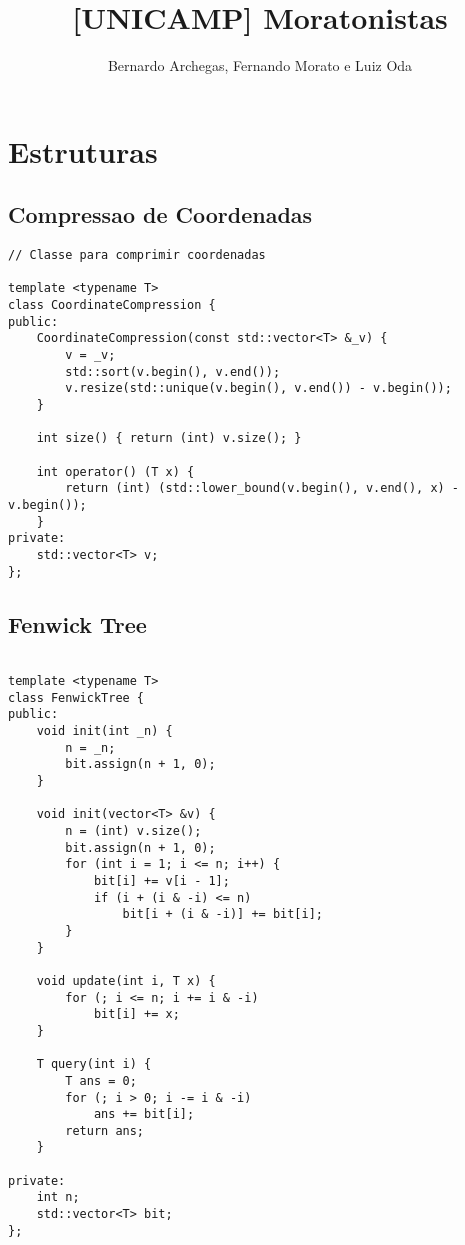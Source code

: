 \documentclass[12pt, a4paper, twoside]{article}
\title{[UNICAMP] Moratonistas}
\author{Bernardo Archegas, Fernando Morato e Luiz Oda}
\begin{document}
\twocolumn
\date{} %
\maketitle


\renewcommand{\contentsname}{Índice} %
\tableofcontents


%
%

\section{Estruturas}

\subsection{Compressao de Coordenadas
}
\begin{lstlisting}
// Classe para comprimir coordenadas

template <typename T>
class CoordinateCompression {
public:
	CoordinateCompression(const std::vector<T> &_v) {
		v = _v;
		std::sort(v.begin(), v.end());
		v.resize(std::unique(v.begin(), v.end()) - v.begin());
	}

	int size() { return (int) v.size(); }

	int operator() (T x) {
		return (int) (std::lower_bound(v.begin(), v.end(), x) - v.begin());
	}
private:
	std::vector<T> v;
};
\end{lstlisting}

\subsection{Fenwick Tree
}
\begin{lstlisting}

template <typename T>
class FenwickTree {
public:
	void init(int _n) {
		n = _n;
		bit.assign(n + 1, 0);
	}

	void init(vector<T> &v) {
		n = (int) v.size();
		bit.assign(n + 1, 0);
		for (int i = 1; i <= n; i++) {
			bit[i] += v[i - 1];
			if (i + (i & -i) <= n)
				bit[i + (i & -i)] += bit[i];
		}
	}

	void update(int i, T x) {
		for (; i <= n; i += i & -i)
			bit[i] += x;
	}

	T query(int i) {
		T ans = 0;
		for (; i > 0; i -= i & -i)
			ans += bit[i];
		return ans;
	}

private:
	int n;
	std::vector<T> bit;
};
\end{lstlisting}
\end{document}
